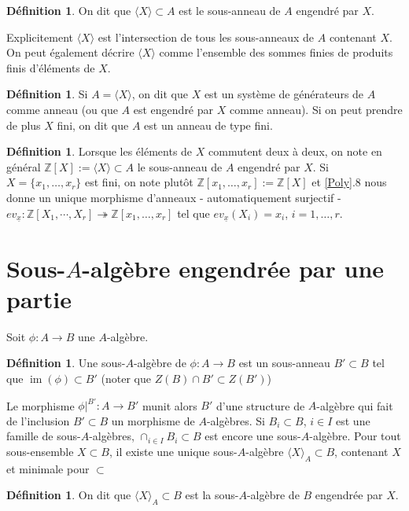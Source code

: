 \documentclass[a4paper, oneside, 12pt]{book}
\theoremstyle{theoremeStyle} %
\theoremstyle{definition} %
\newtheorem{definition}[theoreme]{Définition}
\DeclareMathOperator{\im}{im}
\newcommand{\Z}{\mathbb{Z}}
\begin{document}
\begin{definition}On dit que $\langle X\rangle\subset A$ est le sous-anneau de $A$ engendré par $X$.\end{definition}

	Explicitement $\langle X\rangle$ est l'intersection de tous les sous-anneaux de $A$ contenant $X$. On peut également décrire $\langle X\rangle$ comme  l'ensemble des sommes finies de produits finis d'éléments de $X$.

\begin{definition}Si $A=\langle X\rangle$, on dit que $X$ est un système de générateurs de $A$ comme anneau (ou que $A$ est engendré par $X$ comme anneau). Si on peut prendre de plus $X$ fini, on dit que $A$ est un anneau de type fini.\end{definition}

\begin{definition}Lorsque les éléments de $X$ commutent deux à deux, on note en général $\Z[X]:=\langle X\rangle \subset A$ le sous-anneau de $A$ engendré par $X$. Si  $X=\lbrace x_1,\dots,x_r\rbrace $ est fini, on note plutôt $\Z[x_1,\dots,x_r]:=\Z[X]$ et \ref{Poly}.8  nous donne un unique morphisme d'anneaux - automatiquement  surjectif - $ev_{\underline{x}}:\Z[X_1,\cdots, X_r]\twoheadrightarrow \Z[x_1,\dots,x_r] $ tel que $ev_{\underline{x}}(X_i)=x_i$, $i=1,\dots, r$.\end{definition}

  \section{Sous-$A$-algèbre engendrée par une partie}\label{SousAlg}
  Soit $\phi:A\rightarrow B$ une $A$-algèbre.

  \begin{definition}Une sous-$A$-algèbre de $\phi:A\rightarrow B$ est un sous-anneau $B'\subset B$ tel que $\im(\phi)\subset B'$ (noter que $Z(B)\cap B'\subset Z(B')$)\end{definition}
	  Le morphisme $\phi|^{B'}:A\rightarrow B'$ munit alors $B'$ d'une structure de $A$-algèbre qui fait de l'inclusion $B'\subset B$ un morphisme de $A$-algèbres. Si    $B_i\subset B$, $i\in I$ est une famille de sous-$A$-algèbres, $\cap_{i\in I}B_i\subset B$  est encore une sous-$A$-algèbre. Pour tout sous-ensemble $X\subset B$, il existe
une unique sous-$A$-algèbre $\langle X\rangle_A \subset B$, contenant $X$ et minimale pour $\subset$

	\begin{definition}On dit que $\langle X\rangle_A\subset B$ est la sous-$A$-algèbre de $B$ engendrée par $X$.\end{definition}
\end{document}
